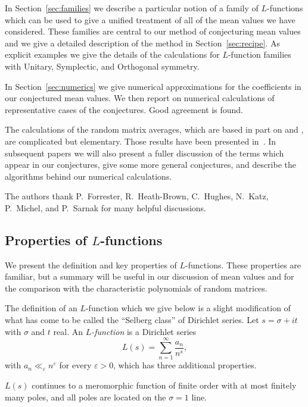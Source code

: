 \documentclass[12pt,letterpaper]{amsart}
\theoremstyle{plain}
\theoremstyle{definition}
\theoremstyle{remark}
\numberwithin{equation}{subsection}
\numberwithin{theorem}{subsection}
\numberwithin{table}{subsection}
\def\dfn{\it} %
\def\myitem#1{\noindent{\it #1 }}
\begin{document}
In Section~\ref{sec:families} we describe a particular notion of a family of
$L$-functions which can be used to give a unified treatment of all
of the mean values we have considered. These families are central
to our method of conjecturing mean values and we give a detailed
description of the method in Section~\ref{sec:recipe}. 
 As explicit examples we give the
details of the calculations for $L$-function families with
Unitary, Symplectic, and Orthogonal symmetry.

In Section~\ref{sec:numerics} we give numerical approximations for the
coefficients in our conjectured mean values.
We then report on numerical calculations of representative cases of
the conjectures.  Good agreement is found.

The calculations of the random matrix averages, which are
based in part on \cite{BF} and \cite{BH}, are
complicated but elementary.  Those results have been presented
in~\cite{CFKRS}.  In subsequent papers we will also
present a fuller discussion of the terms which appear in our
conjectures, give some more general conjectures,
and describe the algorithms behind our numerical calculations.

The authors thank P.~Forrester, R.~Heath-Brown, C.~Hughes, N.~Katz, P.~Michel,
and P.~Sarnak for many helpful discussions.

\subsection{  Properties of $L$-functions }
\label{sec:propofLfunctions}



We present the definition and key properties of $L$-functions.
These properties are familiar, but a summary will be useful in our discussion
of mean values and for the comparison with
the characteristic polynomials of random matrices.

The definition of an $L$-function which we give below is a slight
modification of what has come to be called the ``Selberg class''
\cite{S,CG3,Mur} of Dirichlet series. Let $s=\sigma+it$ with
$\sigma$ and $t$ real. An {\dfn $L$-function} is a Dirichlet
series
\begin{equation}
L(s)=\sum_{n=1}^\infty \frac{a_n}{n^s},
\end{equation}
with $a_n \ll_\varepsilon n^\varepsilon$ for every $\varepsilon>0$, which
has three additional properties.

\myitem{Analytic continuation:}  $L(s)$ continues to a meromorphic
function of finite order with at most finitely many poles, and all
poles are located on the $\sigma=1$ line.
\end{document}
